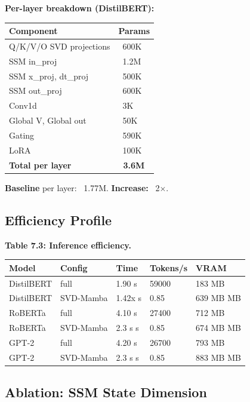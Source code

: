 \textbf{Per-layer breakdown (DistilBERT):}

\begin{table}[H]
\centering
\small
\begin{tabular}{ll}
\toprule
\textbf{Component} & \textbf{Params} \\
\midrule
Q/K/V/O SVD projections & ~600K \\
SSM in\_proj & ~1.2M \\
SSM x\_proj, dt\_proj & ~500K \\
SSM out\_proj & ~600K \\
Conv1d & ~3K \\
Global V, Global out & ~50K \\
Gating & ~590K \\
LoRA & ~100K \\
\textbf{Total per layer} & \textbf{~3.6M} \\
\bottomrule
\end{tabular}
\end{table}

\textbf{Baseline} per layer: ~1.77M. \textbf{Increase:} ~2$\times$.

\subsection{Efficiency Profile}

\textbf{Table 7.3: Inference efficiency.}

\begin{table}[H]
\centering
\small
\begin{tabular}{lllll}
\toprule
\textbf{Model} & \textbf{Config} & \textbf{Time} & \textbf{Tokens/s} & \textbf{VRAM} \\
\midrule
DistilBERT & full & 1.90 s & 59000 & 183 MB \\
DistilBERT & SVD-Mamba & 1.42x s & 0.85 & 639 MB MB \\
RoBERTa & full & 4.10 s & 27400 & 712 MB \\
RoBERTa & SVD-Mamba & 2.3 s s & 0.85 & 674 MB MB \\
GPT-2 & full & 4.20 s & 26700 & 793 MB \\
GPT-2 & SVD-Mamba & 2.3 s s & 0.85 & 883 MB MB \\
\bottomrule
\end{tabular}
\end{table}

\subsection{Ablation: SSM State Dimension}

